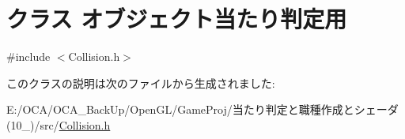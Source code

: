 \hypertarget{class_xE3_x82_xAA_xE3_x83_x96_xE3_x82_xB8_xE3_x82_xA7_xE3_x82_xAF_xE3_x83_x88_xE5_xBD_x93_xE3_x8b482d1fe726eb5db7b8eab866bb915a6}{\section{クラス オブジェクト当たり判定用}
\label{class_xE3_x82_xAA_xE3_x83_x96_xE3_x82_xB8_xE3_x82_xA7_xE3_x82_xAF_xE3_x83_x88_xE5_xBD_x93_xE3_x8b482d1fe726eb5db7b8eab866bb915a6}
}


{\ttfamily \#include $<$Collision.\-h$>$}



このクラスの説明は次のファイルから生成されました\-:\begin{DoxyCompactItemize}
\item 
E\-:/\-O\-C\-A/\-O\-C\-A\-\_\-\-Back\-Up/\-Open\-G\-L/\-Game\-Proj/当たり判定と職種作成とシェーダ(10\-\_)/src/\hyperlink{_collision_8h}{Collision.\-h}\end{DoxyCompactItemize}
